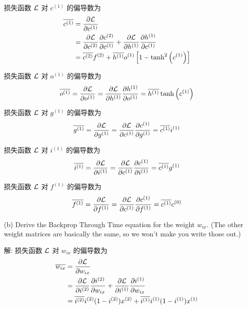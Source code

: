 \documentclass{article}
\begin{document}
损失函数 $\mathcal{L}$ 对 $c^{(1)}$ 的偏导数为
\begin{equation}
  \begin{aligned}
    \overline{c^{(1)}}
    &=\frac{\partial\mathcal{L}}{\partial c^{(1)}}\\
    &=\frac{\partial\mathcal{L}}{\partial c^{(2)}}\frac{\partial c^{(2)}}{\partial c^{(1)}}
      +\frac{\partial\mathcal{L}}{\partial h^{(1)}}\frac{\partial h^{(1)}}{\partial c^{(1)}}\\
    &=\overline{c^{(2)}}f^{(2)}
      +\overline{h^{(1)}}o^{(1)}\left[1-\tanh^2\left(c^{(1)}\right)\right]\\
  \end{aligned}
\end{equation}

损失函数 $\mathcal{L}$ 对 $o^{(1)}$ 的偏导数为
\begin{equation}
    \overline{o^{(1)}}
    =\frac{\partial\mathcal{L}}{\partial o^{(1)}}
    =\frac{\partial\mathcal{L}}{\partial h^{(1)}}\frac{\partial h^{(1)}}{\partial o^{(1)}}
    =\overline{h^{(1)}}\tanh\left(c^{(1)}\right)
\end{equation}

损失函数 $\mathcal{L}$ 对 $g^{(1)}$ 的偏导数为
\begin{equation}
    \overline{g^{(1)}}
    =\frac{\partial\mathcal{L}}{\partial g^{(1)}}
    =\frac{\partial\mathcal{L}}{\partial c^{(1)}}\frac{\partial c^{(1)}}{\partial g^{(1)}}
    =\overline{c^{(1)}}i^{(1)}
\end{equation}

损失函数 $\mathcal{L}$ 对 $i^{(1)}$ 的偏导数为
\begin{equation}
    \overline{i^{(1)}}
    =\frac{\partial\mathcal{L}}{\partial i^{(1)}}
    =\frac{\partial\mathcal{L}}{\partial c^{(1)}}\frac{\partial c^{(1)}}{\partial i^{(1)}}
    =\overline{c^{(1)}}g^{(1)}
\end{equation}

损失函数 $\mathcal{L}$ 对 $f^{(1)}$ 的偏导数为
\begin{equation}
    \overline{f^{(1)}}
    =\frac{\partial\mathcal{L}}{\partial f^{(1)}}
    =\frac{\partial\mathcal{L}}{\partial c^{(1)}}\frac{\partial c^{(1)}}{\partial f^{(1)}}
    =\overline{c^{(1)}}c^{(0)}
\end{equation}

(b) Derive the Backprop Through Time equation for the weight $w_{ix}$. (The other weight matrices are basically the same, so we won't make you write those out.)

解: 损失函数 $\mathcal{L}$ 对 $w_{ix}$ 的偏导数为
\begin{equation}
  \begin{aligned}
    \overline{w_{ix}}
    &=\frac{\partial\mathcal{L}}{\partial w_{ix}}\\
    &=\frac{\partial\mathcal{L}}{\partial i^{(2)}}\frac{\partial i^{(2)}}{\partial w_{ix}}
      +\frac{\partial\mathcal{L}}{\partial i^{(1)}}\frac{\partial i^{(1)}}{\partial w_{ix}}\\
    &=\overline{i^{(2)}}i^{(2)}(1-i^{(2)})x^{(2)}+\overline{i^{(1)}}i^{(1)}(1-i^{(1)})x^{(1)}\\
  \end{aligned}
\end{equation}
\end{document}
